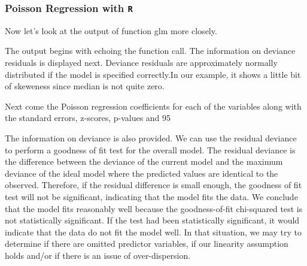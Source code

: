 
\begin{frame}[fragile]

\frametitle{Poisson Regression with \texttt{R}}
\Large 
Now let's look at the output of function glm more closely.

 \item The output begins with echoing the function call. The information on deviance residuals is displayed next. Deviance residuals are approximately normally distributed if the model is specified correctly.In our example, it shows a little bit of skeweness since median is not quite zero. 

\item Next come the Poisson regression coefficients for each of the variables along with the standard errors, z-scores, p-values and 95%

\item The information on deviance is also provided. We can use the residual deviance to perform a goodness of fit test for the overall model. The residual deviance is the difference between the deviance of the current model and the maximum deviance of the ideal model where the predicted values are identical to the observed. Therefore, if the residual difference is small enough, the goodness of fit test will not be significant, indicating that the model fits the data. We conclude that the model fits reasonably well because the goodness-of-fit chi-squared test is not statistically significant. If the test had been statistically significant, it would indicate that the data do not fit the model well. In that situation, we may try to determine if there are omitted predictor variables, if our linearity assumption holds and/or if there is an issue of over-dispersion. 

\end{frame}

